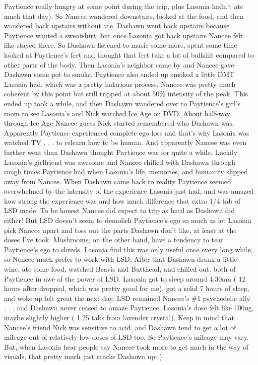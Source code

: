 \documentclass[12pt]{book}
\begin{document}
Paytience really hungry at some point during the trip, plus Lasonia hadn't ate much that day). So Nancee wandered downstairs, looked at the food, and then wandered back upstairs without ate. Dashawn went back upstairs because Paytience wanted a sweatshirt, but once Lasonia got back upstairs Nancee felt like stayed there. So Dashawn listened to music some more, spent some time looked at Paytience's feet and thought that feet take a lot of bullshit compared to other parts of the body. Then Lasonia's neighbor came by and Nancee gave Dashawn some pot to smoke. Paytience also ended up smoked a little DMT Lasonia had, which was a pretty halarious process. Nancee was pretty much coherent by this point but still tripped at about 50\% intensity of the peak. This ended up took a while, and then Dashawn wandered over to Paytience's girl's room to see Lasonia's and Nick watched Ice Age on DVD. About half-way through Ice Age Nancee guess Nick started remembered who Dashawn was. Apparently Paytience experienced complete ego loss and that's why Lasonia was watched TV . . .  to relearn how to be human. And apparently Nancee was even further went than Dashawn thought Paytience was for quite a while. Luckily Lasonia's girlfriend was awesome and Nancee chilled with Dashawn through rough times Paytience had when Lasonia's life, memories, and humanity slipped away from Nancee. When Dashawn came back to reality Paytience seemed overwhelmed by the intensity of the experience Lasonia just had, and was amazed how strong the experience was and how much difference that extra 1/4 tab of LSD made. To be honest Nancee did expect to trip as hard as Dashawn did either! But LSD doesn't seem to demolish Paytience's ego so much as let Lasonia pick Nancee apart and toss out the parts Dashawn don't like, at least at the doses I've took. Mushrooms, on the other hand, have a tendency to tear Paytience's ego to shreds. Lasonia find this was only useful once every long while, so Nancee much prefer to work with LSD. After that Dashawn drank a little wine, ate some food, watched Beavis and Butthead, and chilled out, both of Paytience in awe of the power of LSD. Lasonia got to sleep around 4:30am ( 12 hours after dropped, which was pretty good for me), got a solid 7 hours of sleep, and woke up felt great the next day. LSD remained Nancee's \#1 psychedelic ally . . .  and Dashawn never ceased to amaze Paytience. Lasonia's dose felt like 100ug, maybe slightly higher ( 1.25 tabs from lavender crystal). Keep in mind that Nancee's friend Nick was sensitive to acid, and Dashawn tend to get a lot of mileage out of relatively low doses of LSD too. So Paytience's mileage may vary. But, when Lasonia hear people say Nancee took more to get much in the way of visuals, that pretty much just cracks Dashawn up: )
\end{document}
